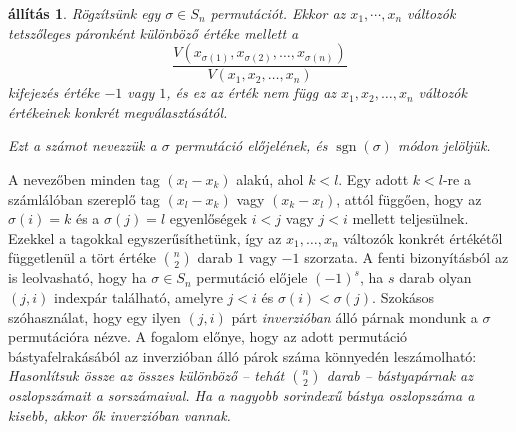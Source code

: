 \documentclass[a4paper, showtrims]{memoir}
\makeatletter
\renewenvironment{proof}[1][\proofname]
    {\par\pushQED{\qed}%
    \normalfont \topsep6\p@\@plus6\p@\relax
    \trivlist
    \item[\hskip\labelsep
        \itshape
    #1\@addpunct{:}]\ignorespaces}
    {\popQED\endtrivlist\@endpefalse}
\theoremstyle{plain}
\newtheorem{proposition}{állítás}[chapter]
\theoremstyle{remark}
\theoremstyle{definition}
\DeclareMathOperator{\sgn}{sgn}
\makeatother
\begin{document}
\begin{proposition}
    Rögzítsünk egy $\sigma\in S_n$ permutációt. 
    Ekkor az $x_1,\cdots,x_n$ változók tetszőleges páronként különböző értéke mellett a
    \[
        \frac{V\left( x_{\sigma(1)},x_{\sigma(2)},\ldots,x_{\sigma(n)} \right)}{V(x_1,x_2,\ldots,x_n)}
    \]
    kifejezés értéke $-1$ vagy $1$, és ez az érték nem függ az 
    $x_1,x_2,\ldots,x_n$ változók értékeinek konkrét megválasztásától.

    Ezt a számot nevezzük a $\sigma$ permutáció \emph{előjelének}, és $\sgn(\sigma)$ módon jelöljük.
\end{proposition}
    \begin{proof}
        A nevezőben minden tag $\left( x_l-x_k \right)$ alakú, ahol $k<l$. 
        Egy adott $k<l$-re
        a számlálóban szereplő tag $\left( x_l-x_k \right)$ vagy $\left( x_k-x_l \right)$, 
        attól függően, hogy az $\sigma(i)=k$ és a $\sigma(j)=l$ 
        egyenlőségek $i<j$ vagy $j<i$ mellett teljesülnek.
        Ezekkel a tagokkal egyszerűsíthetünk, 
        így az $x_1,\dots,x_n$ változók konkrét értékétől függetlenül a tört értéke $\binom{n}{2}$ darab $1$ vagy $-1$ szorzata.
    \end{proof}
    A fenti bizonyításból az is leolvasható, 
    hogy ha $\sigma\in S_n$ permutáció előjele $\left( -1 \right)^s$,
    ha $s$ darab olyan $\left( j,i \right)$ indexpár található,
    amelyre $j<i$ és $\sigma(i)<\sigma(j)$.
    Szokásos szóhasználat, 
    hogy egy ilyen $\left( j,i \right)$ párt \emph{inverzióban} álló párnak mondunk a $\sigma$ permutációra nézve.
    A fogalom előnye, hogy az adott permutáció bástyafelrakásából az inverzióban álló párok száma könnyedén leszámolható:
\emph{
	Hasonlítsuk össze az összes különböző -- tehát $\binom{n}{2}$ darab --
	bástyapárnak az oszlopszámait a sorszámaival.
	Ha a nagyobb sorindexű bástya oszlopszáma a kisebb, akkor ők inverzióban vannak.
}
\end{document}
